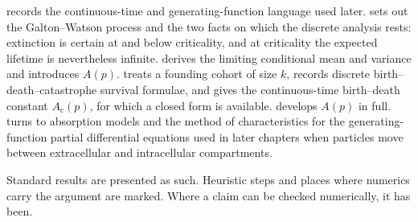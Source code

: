  records the continuous-time and generating-function language used later.  sets out the Galton--Watson process and the two facts on which the discrete analysis rests: extinction is certain at and below criticality, and at criticality the expected lifetime is nevertheless infinite.  derives the limiting conditional mean and variance and introduces \(A(p)\).  treats a founding cohort of size \(k\), records discrete birth--death--catastrophe survival formulae, and gives the continuous-time birth--death constant \(A_{\mathrm{c}}(p)\), for which a closed form is available.  develops \(A(p)\) in full.  turns to absorption models and the method of characteristics for the generating-function partial differential equations used in later chapters when particles move between extracellular and intracellular compartments.

Standard results are presented as such. Heuristic steps and places where numerics carry the argument are marked. Where a claim can be checked numerically, it has been.
